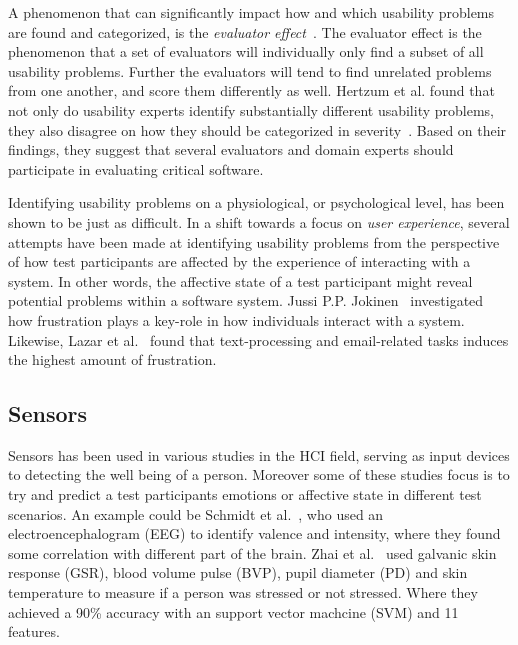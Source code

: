 A phenomenon that can significantly impact how and which usability problems are
found and categorized, is the \textit{evaluator effect}~\cite{eval_effect}.
The evaluator effect is the phenomenon that a set of evaluators will individually only find a subset of all usability problems.
Further the evaluators will tend to find unrelated problems from one another, and score them differently as well.\cite{eval_effect}
Hertzum et al. found that not only do
usability experts identify substantially different usability problems, they also
disagree on how they should be categorized in
severity~\cite{eval_effect_research}. Based on their findings, they suggest that
several evaluators and domain experts should participate in evaluating critical
software.

Identifying usability problems on a physiological, or psychological level, has been shown to be just as difficult. In a
shift towards a focus on \textit{user experience}, several attempts have been made at identifying usability problems
from the perspective of how test participants are affected by the experience of interacting with a system. In other
words, the affective state of a test participant might reveal potential problems within a software system. Jussi
P.P. Jokinen~\cite{workplace_up_study} investigated how frustration plays a key-role in how individuals interact with a
system. Likewise, Lazar et al.~\cite{frustration_with_computers} found that text-processing and email-related tasks
induces the highest amount of frustration.

\subsection{Sensors} %
Sensors has been used in various studies in the HCI field, serving as input devices to detecting the well being of a person.
Moreover some of these studies focus is to try and predict a test participants emotions or affective state in different test scenarios. 
An example could be Schmidt et al.~\cite{schmidt_trainor}, who used an electroencephalogram (EEG) to identify valence and intensity, where they found some correlation with different part of the brain.
Zhai et al.~\cite{gsr_data_processing2} used galvanic skin response (GSR), blood volume pulse (BVP), pupil diameter (PD) and skin temperature to measure if a person was stressed or not stressed. Where they achieved a 90\% accuracy with an support vector machcine (SVM) and 11 features.

